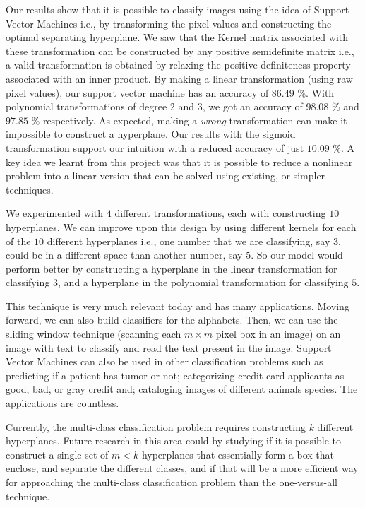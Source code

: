 Our results show that it is possible to classify images using the idea of Support Vector Machines i.e., by transforming the pixel values and constructing the optimal separating hyperplane. We saw that the Kernel matrix associated with these transformation can be constructed by any positive semidefinite matrix i.e., a valid transformation is obtained by relaxing the positive definiteness property associated with an inner product. By making a linear transformation (using raw pixel values), our support vector machine has an accuracy of $86.49$ \%. With polynomial transformations of degree $2$ and $3$, we got an accuracy of $98.08$ \% and $97.85$ \% respectively. As expected, making a \textit{wrong} transformation can make it impossible to construct a hyperplane. Our results with the sigmoid transformation support our intuition with a reduced accuracy of just $10.09$ \%. A key idea we learnt from this project was that it is possible to reduce a nonlinear problem into a linear version that can be solved using existing, or simpler techniques. 

We experimented with $4$ different transformations, each with constructing $10$ hyperplanes. We can improve upon this design by using different kernels for each of the $10$ different hyperplanes i.e., one number that we are classifying, say $3$, could be in a different space than another number, say $5$. So our model would perform better by constructing a hyperplane in the linear transformation for classifying $3$, and a hyperplane in the polynomial transformation for classifying $5$.

This technique is very much relevant today and has many applications. Moving forward, we can also build classifiers for the alphabets. Then, we can use the sliding window technique (scanning each $m\times m$ pixel box in an image) on an image with text to classify and read the text present in the image. Support Vector Machines can also be used in other classification problems such as predicting if a patient has tumor or not; categorizing credit card applicants as good, bad, or gray credit and; cataloging images of different animals species. The applications are countless.

Currently, the multi-class classification problem requires constructing $k$ different hyperplanes. Future research in this area could by studying if it is possible to construct a single set of $m < k$ hyperplanes that essentially form a box that enclose, and separate the different classes, and if that will be a more efficient way for approaching the multi-class classification problem than the one-versus-all technique.